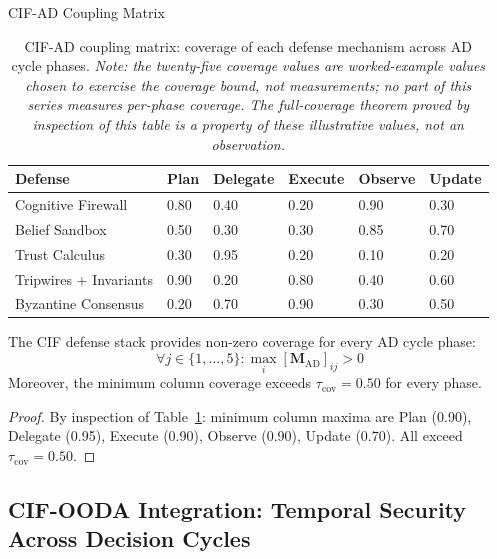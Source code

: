 \documentclass[
  ignorenonframetext,
]{beamer}
\begin{document}
\begin{frame}[allowframebreaks]{CIF-AD Coupling Matrix}
\begin{table}[htbp]
\centering
\caption{CIF-AD coupling matrix: coverage of each defense mechanism across AD cycle phases. \textit{Note: the twenty-five coverage values are worked-example values chosen to exercise the coverage bound, not measurements; no part of this series measures per-phase coverage. The full-coverage theorem proved by inspection of this table is a property of these illustrative values, not an observation.}}
\label{tab:cif-ad-matrix}
\begin{tabular}{@{}llllll@{}}
\toprule
Defense & Plan & Delegate & Execute & Observe & Update \\
\midrule
Cognitive Firewall & 0.80 & 0.40 & 0.20 & 0.90 & 0.30 \\
Belief Sandbox & 0.50 & 0.30 & 0.30 & 0.85 & 0.70 \\
Trust Calculus & 0.30 & 0.95 & 0.20 & 0.10 & 0.20 \\
Tripwires + Invariants & 0.90 & 0.20 & 0.80 & 0.40 & 0.60 \\
Byzantine Consensus & 0.20 & 0.70 & 0.90 & 0.30 & 0.50 \\
\bottomrule
\end{tabular}
\end{table}

\begin{theorem}
\label{thm:cif-ad-coverage}
The CIF defense stack provides non-zero coverage for every AD cycle phase:
\begin{equation}
\label{eq:cif-ad-coverage}
\forall j \in \{1,\ldots,5\}: \max_i [\mathbf{M}_{\text{AD}}]_{ij} > 0
\end{equation}
Moreover, the minimum column coverage exceeds $\tau_{\text{cov}} = 0.50$ for every phase.
\end{theorem}

\begin{proof}
By inspection of Table~\ref{tab:cif-ad-matrix}: minimum column maxima are Plan (0.90), Delegate (0.95), Execute (0.90), Observe (0.90), Update (0.70). All exceed $\tau_{\text{cov}} = 0.50$.
\end{proof}
\end{frame}

\subsection{CIF-OODA Integration: Temporal Security Across Decision
Cycles}\label{sec:cif-ooda}
\end{document}
